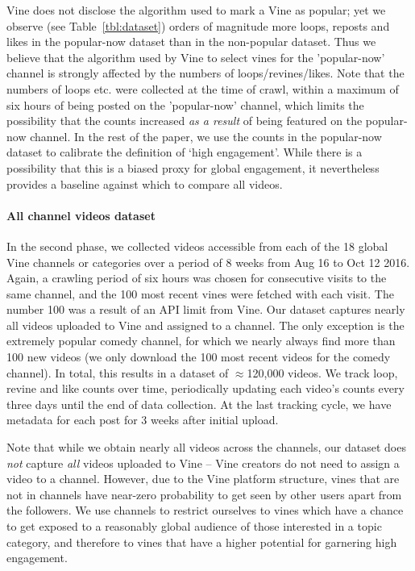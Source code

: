 Vine does not disclose the algorithm used to mark a Vine as popular; yet we observe (see Table~\ref{tbl:dataset}) orders of magnitude more loops, reposts and likes in the popular-now dataset than in the non-popular dataset. Thus we believe that the algorithm used by Vine to select vines for the 'popular-now' channel is strongly affected by the numbers of loops/revines/likes. Note that the numbers of loops etc. were collected at the time of crawl, within a maximum of six hours of being posted on the 'popular-now' channel, which limits the possibility that the counts increased \emph{as a result} of being featured on the popular-now channel. In the rest of the paper, we use the counts in the popular-now dataset to calibrate the definition of `high engagement'. While there is a possibility that this is a biased proxy for global engagement, it nevertheless provides a baseline against which to compare all videos.

\paragraph{All channel videos dataset} In the second phase, we collected 
videos accessible from each of the 18 global Vine channels or categories%
over a period of {8 weeks} from {Aug 16 to Oct 12  2016}. Again, a crawling period of six hours was chosen for consecutive visits to the same channel, and the 100 most recent vines were fetched with each visit. The number 100 was a result of an API limit from Vine. 
Our dataset captures nearly all videos uploaded to Vine and assigned to a channel. The only exception is the extremely popular comedy channel, for which we nearly always find more than 100 new videos (we only download the 100 most recent videos for the comedy channel). In total, this results in a dataset of $\approx$120,000 videos. We track  loop, revine and like counts  over time, periodically updating each video's counts every three days until the end of  data collection. At the last tracking cycle, we have metadata for each post for  3 weeks after initial  upload.

Note that while we obtain nearly all videos across the channels, our dataset does \emph{not} capture  \emph{all} videos uploaded to Vine -- Vine creators do not need to assign a video to a channel. However, due to the Vine platform structure,  vines that are not in channels have near-zero probability to get seen by other users apart from the followers. %
We use channels to restrict ourselves to vines which have a chance to get exposed to a reasonably global audience of those interested in a topic category, and therefore to vines that have a higher potential for garnering high engagement. 

